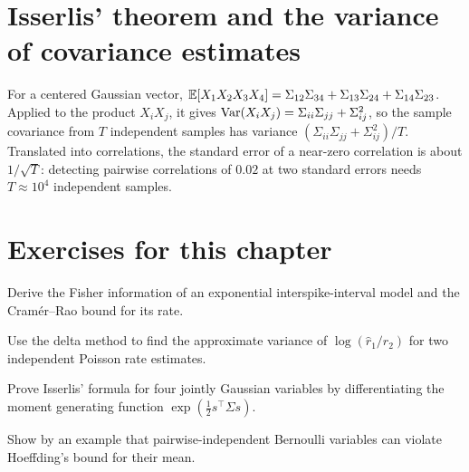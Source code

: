 \section{Isserlis' theorem and the variance of covariance estimates}
For a centered Gaussian vector,
$\mathbb{E}[X_1X_2X_3X_4]=\Sigma_{12}\Sigma_{34}+\Sigma_{13}\Sigma_{24}+\Sigma_{14}\Sigma_{23}$.
Applied to the product $X_iX_j$, it gives
$\operatorname{Var}(X_iX_j)=\Sigma_{ii}\Sigma_{jj}+\Sigma_{ij}^2$, so the sample
covariance from $T$ independent samples has variance
$(\Sigma_{ii}\Sigma_{jj}+\Sigma_{ij}^2)/T$. Translated into correlations,
the standard error of a near-zero correlation is about $1/\sqrt T$:
detecting pairwise correlations of $0.02$ at two standard errors needs
$T\approx10^4$ independent samples.

\section*{Exercises for this chapter}
\begin{exercise}
Derive the Fisher information of an exponential interspike-interval model
and the Cram\'er--Rao bound for its rate.
\end{exercise}
\begin{exercise}
Use the delta method to find the approximate variance of
$\log(\hat r_1/\hat r_2)$ for two independent Poisson rate estimates.
\end{exercise}
\begin{exercise}
Prove Isserlis' formula for four jointly Gaussian variables by
differentiating the moment generating function $\exp(\tfrac12 s^\top\Sigma s)$.
\end{exercise}
\begin{exercise}
Show by an example that pairwise-independent Bernoulli variables can
violate Hoeffding's bound for their mean.
\end{exercise}
